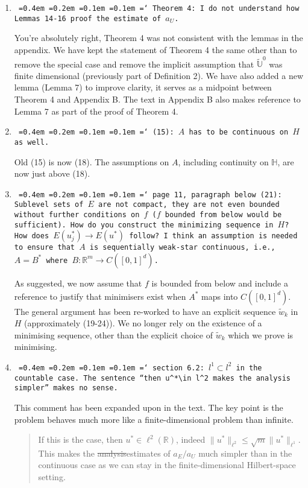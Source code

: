 \documentclass[12pt]{article}
\newcommand*\justify{%
	\fontdimen2\font=0.4em%
	\fontdimen3\font=0.2em%
	\fontdimen4\font=0.1em%
	\fontdimen7\font=0.1em%
	\hyphenchar\font=`\-%
}
\newcommand{\review}[1]{\texttt{\justify{#1}}}
\newcommand{\F}[1]{\mathbb{#1}}
\newcommand{\edit}[2]{{\color{red}\sout{#1}}{\color{darkgreen}#2}}
\begin{document}
\begin{enumerate}
	\item \review{Theorem 4: I do not understand how Lemmas 14-16 proof the estimate of $a_U$.}

	You're absolutely right, Theorem 4 was not consistent with the lemmas in the appendix. We have kept the statement of Theorem 4 the same other than to remove the special case and remove the implicit assumption that $\tilde{\F U}^0$ was finite dimensional (previously part of Definition 2). We have also added a new lemma (Lemma 7) to improve clarity, it serves as a midpoint between Theorem 4 and Appendix B. The text in Appendix B also makes reference to Lemma 7 as part of the proof of Theorem 4.
	
	\item \review{(15): $A$ has to be continuous on $H$ as well.}

	Old (15) is now (18). The assumptions on $A$, including continuity on $\F H$, are now just above (18).
	
	\item \review{page 11, paragraph below (21): Sublevel sets of $E$ are not compact, they are not even bounded without further conditions on $f$ ($f$ bounded from below would be sufficient). How do you construct the minimizing sequence in $H$? How does $E(u^*_j) \to E(u^*)$ follow? I think an assumption is needed to ensure that $A$ is sequentially weak-star continuous, i.e., $A = B^*$ where $B : \mathbb{R}^m \to C([0, 1]^d)$.}
	
	As suggested, we now assume that $f$ is bounded from below and include a reference to justify that minimisers exist when $A^*$ maps into $C([0,1]^d)$. The general argument has been re-worked to have an explicit sequence $\tilde w_k$ in $H$ (approximately (19-24)). We no longer rely on the existence of a minimising sequence, other than the explicit choice of $\tilde w_k$ which we prove is minimising.
	
	\item \review{section 6.2: $l^1\subset l^2$ in the countable case. The sentence ``then $u^*\in l^2$ makes the analysis simpler'' makes no sense.}
	
	This comment has been expanded upon in the text. The key point is the problem behaves much more like a finite-dimensional problem than infinite.
	\begin{quote}
		If this is the case, then $u^*\in \ell^2(\F R)$\edit{}{, indeed $\|u^*\|_{\ell^2}\leq\sqrt{m}\|u^*\|_{\ell^1}$. } This makes the \edit{analysis}{estimates of $a_E/a_U$} much simpler than in the continuous case\edit{}{ as we can stay in the finite-dimensional Hilbert-space setting}.
	\end{quote}
	

\end{enumerate}
\end{document}
